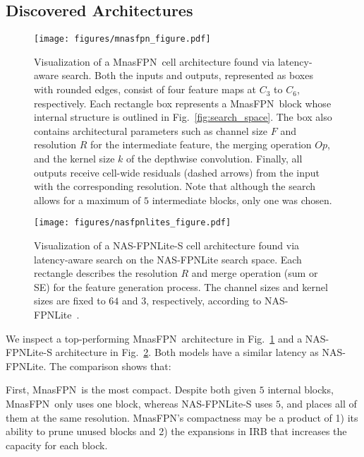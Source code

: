 \documentclass[10pt,twocolumn,letterpaper]{article}
\def\Mnasfpn{MnasFPN~}
\def\Mnasfpnnospace{MnasFPN}
\begin{document}
\subsection{Discovered Architectures}
\label{sec:arch}




\begin{figure}[!t]
    \centering
    \texttt{[image: figures/mnasfpn\_figure.pdf]}
    \caption{Visualization of a \Mnasfpn cell architecture found via latency-aware search. Both the inputs and outputs, represented as boxes with rounded edges, consist of four feature maps at $C_3$ to $C_6$, respectively. Each rectangle box represents a \Mnasfpn block whose internal structure is outlined in Fig.~\ref{fig:search_space}. The box also contains architectural parameters such as channel size $F$ and resolution $R$ for the intermediate feature, the merging operation $Op$, and the kernel size $k$ of the depthwise convolution. Finally, all outputs receive cell-wide residuals (dashed arrows) from the input with the corresponding resolution. Note that although the search allows for a maximum of $5$ intermediate blocks, only one was chosen.}
    \label{fig:arch}
\end{figure}

\begin{figure}[!t]
    \centering
    \texttt{[image: figures/nasfpnlites\_figure.pdf]}
    \caption{Visualization of a NAS-FPNLite-S cell architecture found via latency-aware search on the NAS-FPNLite search space. Each rectangle describes the resolution $R$ and merge operation (sum or SE) for the feature generation process. The channel sizes and kernel sizes are fixed to $64$ and $3$, respectively, according to NAS-FPNLite~\cite{ghiasi2019fpn}. }
    \label{fig:arch_nasfpn}
\end{figure}


We inspect a top-performing \Mnasfpn architecture in Fig.~\ref{fig:arch} and a NAS-FPNLite-S architecture in Fig.~\ref{fig:arch_nasfpn}. Both models have a similar latency as NAS-FPNLite. The comparison shows that:

    First, \Mnasfpn is the most compact. Despite both given $5$ internal blocks, \Mnasfpn only uses one block, whereas NAS-FPNLite-S uses $5$, and places all of them at the same resolution. \Mnasfpnnospace's compactness may be a product of 1) its ability to prune unused blocks and 2) the expansions in IRB that increases the capacity for each block.
    
\end{document}
